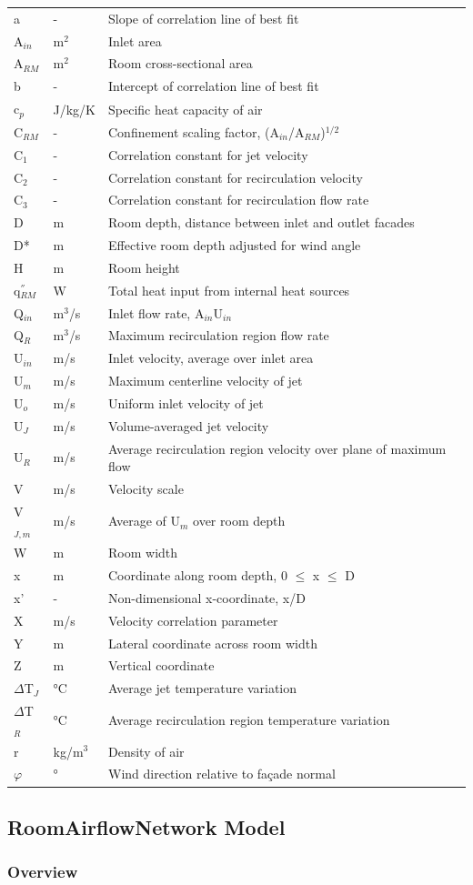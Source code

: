 {\begin{longtable}[c]{p{1.0in}p{1.0in}p{3.5in}}
a & - & Slope of correlation line of best fit \tabularnewline
A\(_{in}\) & m\(^2\) & Inlet area \tabularnewline
A\(_{RM}\) & m\(^2\) & Room cross-sectional area \tabularnewline
b & - & Intercept of correlation line of best fit \tabularnewline
c\(_{p}\) & J/kg/K & Specific heat capacity of air \tabularnewline
C\(_{RM}\) & - & Confinement scaling factor, (A\(_{in}\)/A\(_{RM}\))\(^{1/2}\) \tabularnewline
C\(_{1}\) & - & Correlation constant for jet velocity \tabularnewline
C\(_{2}\) & - & Correlation constant for recirculation velocity \tabularnewline
C\(_{3}\) & - & Correlation constant for recirculation flow rate \tabularnewline
D & m & Room depth, distance between inlet and outlet facades \tabularnewline
D* & m & Effective room depth adjusted for wind angle \tabularnewline
H & m & Room height \tabularnewline
q\(^{''}_{RM}\) & W & Total heat input from internal heat sources \tabularnewline
Q\(_{in}\) & m\(^3\)/s & Inlet flow rate, A\(_{in}\)U\(_{in}\) \tabularnewline
Q\(_R\) & m\(^3\)/s & Maximum recirculation region flow rate \tabularnewline
U\(_{in}\) & m/s & Inlet velocity, average over inlet area \tabularnewline
U\(_{m}\) & m/s & Maximum centerline velocity of jet \tabularnewline
U\(_{o}\) & m/s & Uniform inlet velocity of jet \tabularnewline
U\(_{J}\) & m/s & Volume-averaged jet velocity \tabularnewline
U\(_{R}\) & m/s & Average recirculation region velocity over plane of maximum flow \tabularnewline
V & m/s & Velocity scale \tabularnewline
V\(_{J,m}\) & m/s & Average of U\(_{m}\) over room depth \tabularnewline
W & m & Room width \tabularnewline
x & m & Coordinate along room depth, 0 $\leq$ x $\leq$ D \tabularnewline
x' & - & Non-dimensional x-coordinate, x/D \tabularnewline
X & m/s & Velocity correlation parameter \tabularnewline
Y & m & Lateral coordinate across room width \tabularnewline
Z & m & Vertical coordinate \tabularnewline
$\Delta$T\(_{J}\) & °C & Average jet temperature variation \tabularnewline
$\Delta$T\(_{R}\) & °C & Average recirculation region temperature variation \tabularnewline
r & kg/m\(^3\) & Density of air \tabularnewline
$\varphi$ & ° & Wind direction relative to façade normal \tabularnewline
\bottomrule
\end{longtable}

\subsection{RoomAirflowNetwork Model}\label{roomairflownetwork-model}

\subsubsection{Overview}\label{overview-4-001}

}
